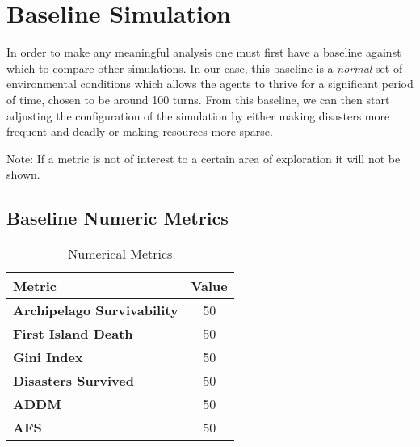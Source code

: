 \section{Baseline Simulation}
\label{sec:Simulations:baseline}

In order to make any meaningful analysis one must first have a baseline against which to compare other simulations. In our case, this baseline is a \emph{normal} set of environmental conditions which allows the agents to thrive for a significant period of time, chosen to be around 100 turns. From this baseline, we can then start adjusting the configuration of the simulation by either making disasters more frequent and deadly or making resources more sparse.

Note: If a metric is not of interest to a certain area of exploration it will not be shown.

\subsection{Baseline Numeric Metrics}
\label{subsec:Simulations:baseline:num_metrics}
\begin{table}[htb]
    \centering
    \begin{tabular}{|l|c|}
    \hline
    \textbf{Metric}                     & \textbf{Value} \\ \hline
    \textbf{Archipelago Survivability}  & 50     \\
    \textbf{First Island Death}         & 50     \\
    \textbf{Gini Index}                 & 50     \\
    \textbf{Disasters Survived}         & 50     \\
    \textbf{ADDM}                       & 50     \\
    \textbf{AFS}                        & 50     \\ \hline
\end{tabular}
\caption{Numerical Metrics}
\end{table}

